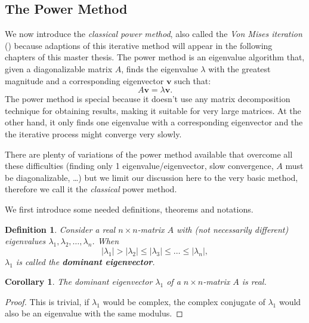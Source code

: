 \documentclass[a4paper,11pt]{report}
\newtheorem{definition}[theorem]{Definition}
\newtheorem{corollary}[theorem]{Corollary}
\begin{document}
\subsection{The Power Method}\label{powersection}
We now introduce the \textit{classical power method}, also called the \textit{Von Mises iteration} (\cite{golub}) because adaptions of 
this iterative method will appear in the following chapters of this master thesis. 
The power method is an eigenvalue algorithm that, given a diagonalizable matrix $A$, finds the eigenvalue $\lambda$ with the 
greatest magnitude and a corresponding eigenvector $\mathbf{v}$ such that:
$$A\mathbf{v} = \lambda\mathbf{v}.$$
The power method is special because it doesn't use any matrix decomposition 
technique for obtaining results, making it suitable for very large matrices. At 
the other hand, it only finds one eigenvalue with a corresponding eigenvector and the 
the iterative process might converge very slowly. 

There are plenty of variations of the 
power method available that overcome all these difficulties (finding only 1 eigenvalue/eigenvector, slow convergence, $A$ must be diagonalizable, \ldots) but we limit our discussion
here to the very basic method, therefore we call it the \textit{classical} power method.

We first introduce some needed definitions, theorems and notations.
\begin{definition}
  Consider a  real $n\times n$-matrix $A$ with (not necessarily different) 
  eigenvalues $\lambda_1, \lambda_2, \ldots, \lambda_n$. When
  $$|\lambda_1| > |\lambda_2| \leq |\lambda_3| \leq \ldots \leq |\lambda_n|,$$
  $\lambda_1$ is called the \textbf{dominant eigenvector}.
\end{definition}

\begin{corollary}
  The dominant eigenvector $\lambda_1$ of a $n\times n$-matrix $A$ is real.
\end{corollary}
\begin{proof}
  This is trivial, if $\lambda_1$ would be complex, the complex conjugate of $\lambda_1$ 
  would also be an eigenvalue with the same modulus.
  \end{proof}
\end{document}
